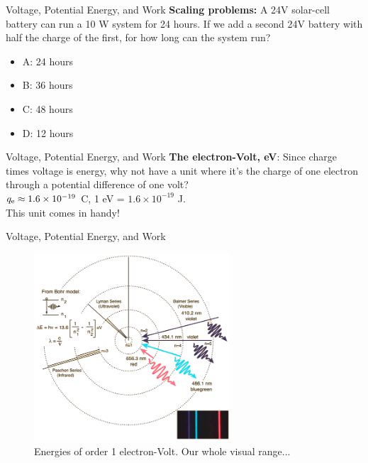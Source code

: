 \documentclass{beamer}
\begin{document}
\begin{frame}{Voltage, Potential Energy, and Work}
\textbf{Scaling problems:} A 24V solar-cell battery can run a 10 W system for 24 hours.  If we add a second 24V battery with half the charge of the first, for how long can the system run?
\begin{itemize}
\item A: 24 hours
\item B: 36 hours
\item C: 48 hours
\item D: 12 hours
\end{itemize}
\end{frame}

\begin{frame}{Voltage, Potential Energy, and Work}
\textbf{The electron-Volt, eV}: Since charge times voltage is energy, why not have a unit where it's the charge of one electron through a potential difference of one volt? \\ \vspace{0.5cm}
$q_{\rm e} \approx 1.6 \times 10^{-19}$ C, 1 eV = $1.6 \times 10^{-19}$ J. \\ \vspace{0.5cm}
This unit comes in handy!
\end{frame}

\begin{frame}{Voltage, Potential Energy, and Work}
\begin{figure}
\centering
\includegraphics[width=0.65\textwidth]{figures/H.png}
\caption{\label{fig:H} Energies of order 1 electron-Volt. Our whole visual range...}
\end{figure}
\end{frame}
\end{document}
